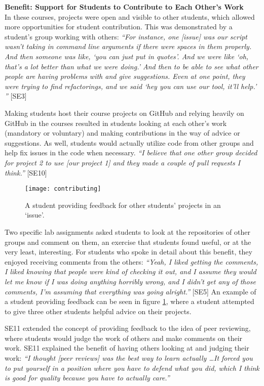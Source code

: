 \textbf{Benefit: Support for Students to Contribute to Each Other's Work} \\
In these courses, projects were open and visible to other students, which allowed more opportunities for student contribution. This was demonstrated by a student's group working with others:
\textit{``For instance, one [issue] was our script wasn't taking in command line arguments if there were spaces in them properly. And then someone was like, `you can just put in quotes'. And we were like `oh, that's a lot better than what we were doing.' And then to be able to see what other people are having problems with and give suggestions. Even at one point, they were trying to find refactorings, and we said `hey you can use our tool, it'll help.' ''} [SE3]

Making students host their course projects on GitHub and relying heavily on GitHub in the courses resulted in students looking at each other's work (mandatory or voluntary) and making contributions in the way of advice or suggestions. As well, students would actually utilize code from other groups and help fix issues in the code when necessary. \textit{``I believe that one other group decided for project 2 to use [our project 1] and they made a couple of pull requests I think.''} [SE10]

\begin{figure}[h!]
 \caption{A student providing feedback for other students' projects in an `issue'.}
 \centering
   \texttt{[image: contributing]}
 \label{fig:contributing}
\end{figure}

Two specific lab assignments asked students to look at the repositories of other groups and comment on them, an exercise that students found useful, or at the very least, interesting. For students who spoke in detail about this benefit, they enjoyed receiving comments from the others: \textit{``Yeah, I liked getting the comments, I liked knowing that people were kind of checking it out, and I assume they would let me know if I was doing anything horribly wrong, and I didn't get any of those comments, I'm assuming that everything was going alright.''} [SE5] An example of a student providing feedback can be seen in figure \ref{fig:contributing}, where a student attempted to give three other students helpful advice on their projects.

SE11 extended the concept of providing feedback to the idea of peer reviewing, where students would judge the work of others and make comments on their work. SE11 explained the benefit of having others looking at and judging their work: \textit{``I thought [peer reviews] was the best way to learn actually \ldots It forced you to put yourself in a position where you have to defend what you did, which I think is good for quality because you have to actually care.''}

